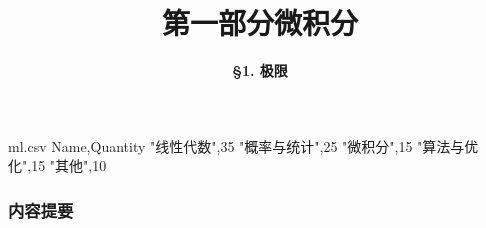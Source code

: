 
\usepackage{datapie}

\begin{filecontents}{ml.csv}
Name,Quantity
"线性代数",35
"概率与统计",25
"微积分",15
"算法与优化",15
"其他",10
\end{filecontents}








\title[Calculus]{\LARGE \bfseries 第一部分\quad 微积分} %
\author[Limit] %
{\Large \bfseries \S 1. 极限
}
\date{}



\begin{frame}
\titlepage %
\end{frame}

\begin{frame}
\frametitle{内容提要} %
\tableofcontents %
\end{frame}


